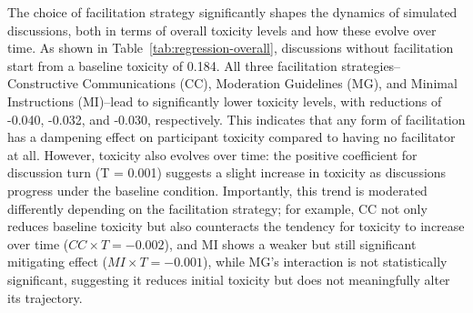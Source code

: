 The choice of facilitation strategy significantly shapes the dynamics of simulated discussions, both in terms of overall toxicity levels and how these evolve over time. As shown in Table~\ref{tab:regression-overall}, discussions without facilitation start from a baseline toxicity of 0.184. All three facilitation strategies--Constructive Communications (CC), Moderation Guidelines (MG), and Minimal Instructions (MI)--lead to significantly lower toxicity levels, with reductions of -0.040, -0.032, and -0.030, respectively. This indicates that any form of facilitation has a dampening effect on participant toxicity compared to having no facilitator at all. However, toxicity also evolves over time: the positive coefficient for discussion turn (T = 0.001) suggests a slight increase in toxicity as discussions progress under the baseline condition. Importantly, this trend is moderated differently depending on the facilitation strategy; for example, CC not only reduces baseline toxicity but also counteracts the tendency for toxicity to increase over time ($CC\times T = -0.002$), and MI shows a weaker but still significant mitigating effect ($MI\times T = -0.001$), while MG’s interaction is not statistically significant, suggesting it reduces initial toxicity but does not meaningfully alter its trajectory.



